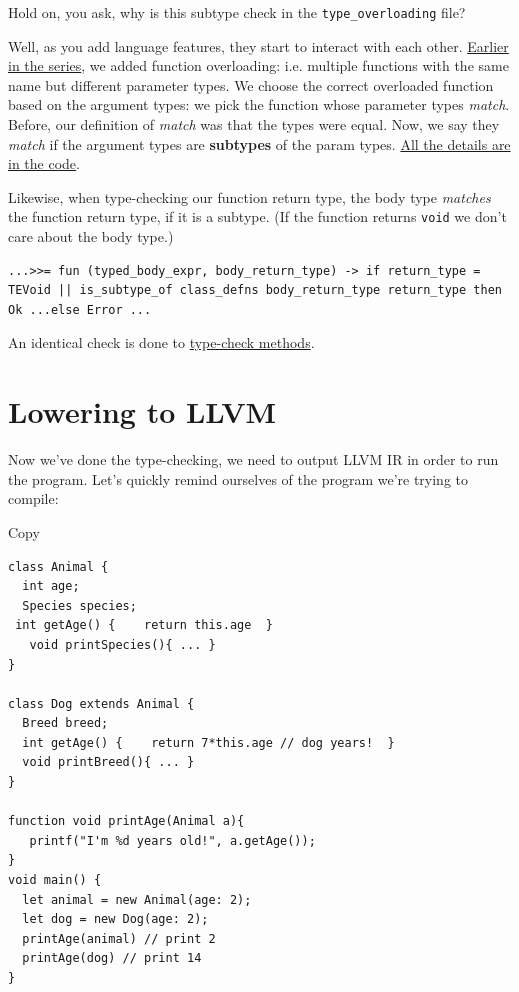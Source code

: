 Hold on, you ask, why is this subtype check in the
\texttt{type\_overloading} file?

Well, as you add language features, they start to interact with each
other.
\href{https://mukulrathi.com/create-your-own-programming-language/lower-language-constructs-to-llvm/}{Earlier
in the series}, we added function overloading: i.e. multiple functions
with the same name but different parameter types. We choose the correct
overloaded function based on the argument types: we pick the function
whose parameter types \emph{match}. Before, our definition of
\emph{match} was that the types were equal. Now, we say they
\emph{match} if the argument types are \textbf{subtypes} of the param
types.
\href{https://github.com/mukul-rathi/bolt/blob/master/src/frontend/typing/type_overloading.ml\#L89}{All
the details are in the code}.

Likewise, when type-checking our function return type, the body type
\emph{matches} the function return type, if it is a subtype. (If the
function returns \texttt{void} we don't care about the body type.)

%

\begin{lstlisting}[language=caml,caption={type\_functions.ml}]
...>>= fun (typed_body_expr, body_return_type) -> if return_type = TEVoid || is_subtype_of class_defns body_return_type return_type then    Ok ...else Error ...
\end{lstlisting}

An identical check is done to
\href{https://github.com/mukul-rathi/bolt/blob/master/src/frontend/typing/type_classes.ml\#L84}{type-check
methods}.

\hypertarget{lowering-to-llvm}{%
\section{\texorpdfstring{\protect\hyperlink{lowering-to-llvm}{}Lowering
to LLVM}{Lowering to LLVM}}\label{lowering-to-llvm}}

Now we've done the type-checking, we need to output LLVM IR in order to
run the program. Let's quickly remind ourselves of the program we're
trying to compile:

Copy

\begin{verbatim}
class Animal {  
  int age;  
  Species species;  
 int getAge() {    return this.age  } 
   void printSpecies(){ ... }
}

class Dog extends Animal {  
  Breed breed;  
  int getAge() {    return 7*this.age // dog years!  }  
  void printBreed(){ ... }
}

function void printAge(Animal a){  
   printf("I'm %d years old!", a.getAge());
}
void main() {
  let animal = new Animal(age: 2);
  let dog = new Dog(age: 2);
  printAge(animal) // print 2
  printAge(dog) // print 14
}
\end{verbatim}

